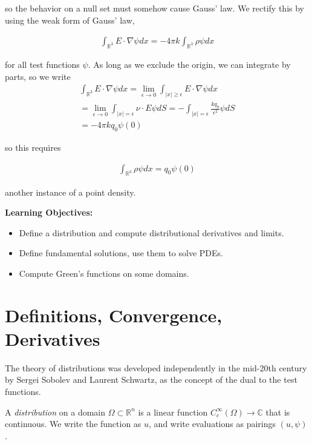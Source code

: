 \documentclass{article}
\newcommand{\R}{{\mathbb{R}}}
\newcommand{\C}{{\mathbb{C}}}
\begin{document}
	so the behavior on a null set must somehow cause Gauss' law. We rectify this by using the weak form of Gauss' law,
	
	\begin{align*}
		\int_{\R^{3}} E \cdot \nabla \psi dx = - 4\pi k \int_{\R^{3}} \rho \psi dx
	\end{align*}
	
	for all test functions $\psi$. As long as we exclude the origin, we can integrate by parts, so we write 
	\begin{align*}
		\int_{\R^{3}} E \cdot \nabla \psi dx = \lim_{\epsilon \to 0} \int_{|x| \geq \epsilon} E \cdot \nabla \psi dx \\
		=\lim_{\epsilon \to 0} \int_{|x| = \epsilon} \nu \cdot E \psi dS = -\int_{|x| = \epsilon} \frac{k q_0}{\epsilon^{2}} \psi dS\\
		= -4 \pi k q_0 \psi(0)
	\end{align*}
	
	so this requires
	
	\begin{align*}
		\int_{\R^{3}} \rho \psi dx = q_0 \psi(0)
	\end{align*}
	
	another instance of a point density. 
	
	
	\vspace{1 cm}
	\textbf{Learning Objectives:}
	
	\begin{itemize}
		\item Define a distribution and compute distributional derivatives and limits. 
		\item Define fundamental solutions, use them to solve PDEs.
		\item Compute Green's functions on some domains. 
	\end{itemize}
	
	\section{Definitions, Convergence, Derivatives}
	
	The theory of distributions was developed independently in the mid-20th century by Sergei Sobolev and Laurent Schwartz, as the concept of the dual to the test functions.
	
	A \textit{distribution} on a domain $\Omega \subset \R^{n}$ is a linear function $C_{c}^{\infty}(\Omega) \to \C$ that is continuous. We write the function as $u$, and write evaluations as pairings $(u,\psi)$. 
	
\end{document}
